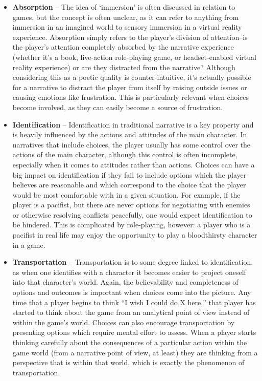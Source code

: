 \begin{itemize}
  \item \textbf{Absorption} -- The idea of `immersion' is often discussed in relation to games, but the concept is often unclear, as it can refer to anything from immersion in an imagined world to sensory immersion in a virtual reality experience.
%
Absorption simply refers to the player's division of attention--is the player's attention completely absorbed by the narrative experience (whether it's a book, live-action role-playing game, or headset-enabled virtual reality experience) or are they distracted from the narrative?
%
Although considering this as a poetic quality is counter-intuitive, it's actually possible for a narrative to distract the player from itself by raising outside issues or causing emotions like frustration.
%
This is particularly relevant when choices become involved, as they can easily become a source of frustration.

  \item \textbf{Identification} -- Identification in traditional narrative is a key property and is heavily influenced by the actions and attitudes of the main character.
%
In narratives that include choices, the player usually has some control over the actions of the main character, although this control is often incomplete, especially when it comes to attitudes rather than actions.
%
Choices can have a big impact on identification if they fail to include options which the player believes are reasonable and which correspond to the choice that the player would be most comfortable with in a given situation.
%
For example, if the player is a pacifist, but there are never options for negotiating with enemies or otherwise resolving conflicts peacefully, one would expect identification to be hindered.
%
This is complicated by role-playing, however: a player who is a pacifist in real life may enjoy the opportunity to play a bloodthirsty character in a game.

  \item \textbf{Transportation} -- Transportation is to some degree linked to identification, as when one identifies with a character it becomes easier to project oneself into that character's world.
%
Again, the believability and completeness of options and outcomes is important when choices come into the picture.
%
Any time that a player begins to think ``I wish I could do X here,'' that player has started to think about the game from an analytical point of view instead of within the game's world.
%
Choices can also encourage transportation by presenting options which require mental effort to assess.
%
When a player starts thinking carefully about the consequences of a particular action within the game world (from a narrative point of view, at least) they are thinking from a perspective that is within that world, which is exactly the phenomenon of transportation.


\end{itemize}

